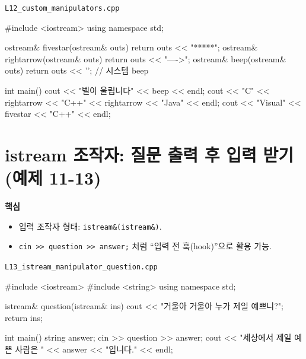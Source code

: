 \documentclass[11pt,a4paper]{article}
\newcommand{\filetag}[1]{\texttt{\color{Accent}#1}}
\begin{document}
\noindent\filetag{L12\_custom\_manipulators.cpp}
\begin{cppcode}
#include <iostream>
using namespace std;

ostream& fivestar(ostream& outs) { return outs << "*****"; }
ostream& rightarrow(ostream& outs) { return outs << "---->"; }
ostream& beep(ostream& outs) { return outs << '\a'; } // 시스템 beep

int main() {
    cout << "벨이 울립니다" << beep << endl;
    cout << "C" << rightarrow << "C++" << rightarrow << "Java" << endl;
    cout << "Visual" << fivestar << "C++" << endl;
}
\end{cppcode}

\section{istream 조작자: 질문 출력 후 입력 받기 (예제 11-13)}
\begin{GoalBox}
\textbf{핵심}
\begin{itemize}[leftmargin=18pt]
  \item 입력 조작자 형태: \texttt{istream\&(istream\&)}. %
  \item \texttt{cin >> question >> answer;} 처럼 ``입력 전 훅(hook)''으로 활용 가능.
\end{itemize}
\end{GoalBox}

\noindent\filetag{L13\_istream\_manipulator\_question.cpp}
\begin{cppcode}
#include <iostream>
#include <string>
using namespace std;

istream& question(istream& ins) {
    cout << "거울아 거울아 누가 제일 예쁘니?";
    return ins;
}

int main() {
    string answer;
    cin >> question >> answer;
    cout << "세상에서 제일 예쁜 사람은 " << answer << "입니다." << endl;
}
\end{cppcode}
\end{document}
